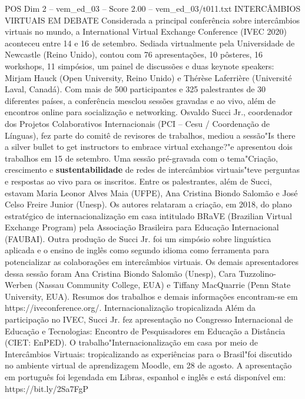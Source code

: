 \begin{textsample}{POS Dim 2 – vem\_ed\_03 – Score 2.00 – vem\_ed\_03/t011.txt}  \label{ex:f2_pos_133}
INTERCÂMBIOS VIRTUAIS EM DEBATE Considerada a principal conferência sobre intercâmbios virtuais no mundo, a International Virtual Exchange Conference (IVEC 2020) aconteceu entre 14 e 16 de setembro.
Sediada virtualmente pela Universidade de Newcastle (Reino Unido), contou com 76 apresentações, 10 pôsteres, 16 workshops, 11 simpósios, um painel de discussões e duas keynote speakers: Mirjam Hauck (Open University, Reino Unido) e Thérèse Laferrière (Université Laval, Canadá).
Com mais de 500 participantes e 325 palestrantes de 30 diferentes países, a conferência mesclou sessões gravadas e ao vivo, além de encontros online para socialização e networking.
Osvaldo Succi Jr., coordenador dos Projetos Colaborativos Internacionais (PCI – Cesu / Coordenação de Línguas), fez parte do comitê de revisores de trabalhos, mediou a sessão"Is there a silver bullet to get instructors to embrace virtual exchange?"e apresentou dois trabalhos em 15 de setembro.
Uma sessão pré-gravada com o tema"Criação, crescimento e \textbf{sustentabilidade} de redes de intercâmbios virtuais"teve perguntas e respostas ao vivo para os inscritos.
Entre os palestrantes, além de Succi, estavam Maria Leonor Alves Maia (UFPE), Ana Cristina Biondo Salomão e José Celso Freire Junior (Unesp).
Os autores relataram a criação, em 2018, do plano estratégico de internacionalização em casa intitulado BRaVE (Brazilian Virtual Exchange Program) pela Associação Brasileira para Educação Internacional (FAUBAI).
Outra produção de Succi Jr. foi um simpósio sobre linguística aplicada e o ensino de inglês como segundo idioma como ferramenta para potencializar as colaborações em intercâmbios virtuais.
Os demais apresentadores dessa sessão foram Ana Cristina Biondo Salomão (Unesp), Cara Tuzzolino-Werben (Nassau Community College, EUA) e Tiffany MacQuarrie (Penn State University, EUA).
Resumos dos trabalhos e demais informações encontram-se em https://iveconference.org/.
Internacionalização tropicalizada Além da participação no IVEC, Succi Jr. fez apresentação no Congresso Internacional de Educação e Tecnologias: Encontro de Pesquisadores em Educação a Distância (CIET: EnPED).
O trabalho"Internacionalização em casa por meio de Intercâmbios Virtuais: tropicalizando as experiências para o Brasil"foi discutido no ambiente virtual de aprendizagem Moodle, em 28 de agosto.
A apresentação em português foi legendada em Libras, espanhol e inglês e está disponível em: https://bit.ly/2Sa7FgP

\end{textsample}
